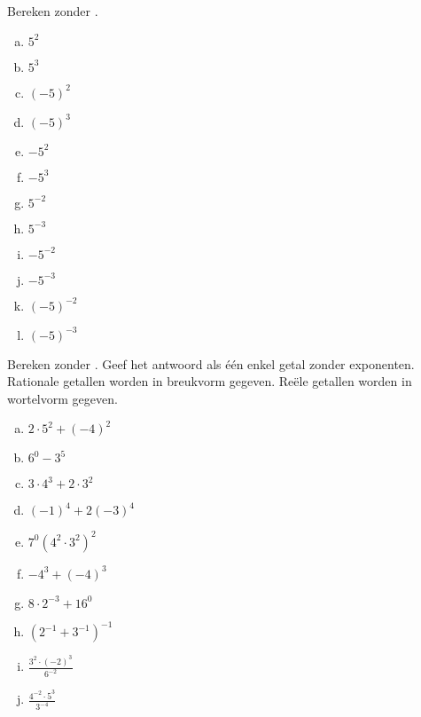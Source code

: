 \documentclass[12pt,twoside]{article}
\begin{document}
\begin{oefening}
Bereken zonder .
\begin{multicols}{4}
  \begin{enumerate}[(a)]
    \itemsep1em
    \item $5^2$
    \item $5^3$
    \item $(-5)^2$
    \item $(-5)^3$
    \item $-5^2$
    \item $-5^3$
    \item $5^{-2}$
    \item $5^{-3}$
    \item $-5^{-2}$
    \item $-5^{-3}$
    \item $(-5)^{-2}$
    \item $(-5)^{-3}$
  \end{enumerate}
\end{multicols}
\end{oefening}

\begin{oefening}
  Bereken zonder . Geef het antwoord als één enkel getal zonder exponenten. Rationale getallen worden in breukvorm gegeven. Reële getallen worden in wortelvorm gegeven.
  \begin{multicols}{3}
    \begin{enumerate}[(a)]
      \itemsep1em
    \item $2 \cdot {5^2} + {\left( { - 4} \right)^2}$
    \item ${6^0} - {3^5}$
    \item $3 \cdot {4^3} + 2 \cdot {3^2}$
    \item ${\left( { - 1} \right)^4} + 2{\left( { - 3} \right)^4}$
    \item ${7^0}{\left( {{4^2} \cdot {3^2}} \right)^2}$
    \item $- {4^3} + {\left( { - 4} \right)^3}$
    \item $8 \cdot {2^{ - 3}} + {16^0}$
    \item ${\left( {{2^{ - 1}} + {3^{ - 1}}} \right)^{ - 1}}$
    \item $\displaystyle \frac{{{3^2} \cdot {{\left( { - 2} \right)}^3}}}{{{6^{ - 2}}}}$
    \item $\displaystyle \frac{{{4^{ - 2}} \cdot {5^3}}}{{{3^{ - 4}}}}$
    \end{enumerate}
  \end{multicols}
\end{oefening}
\end{document}
